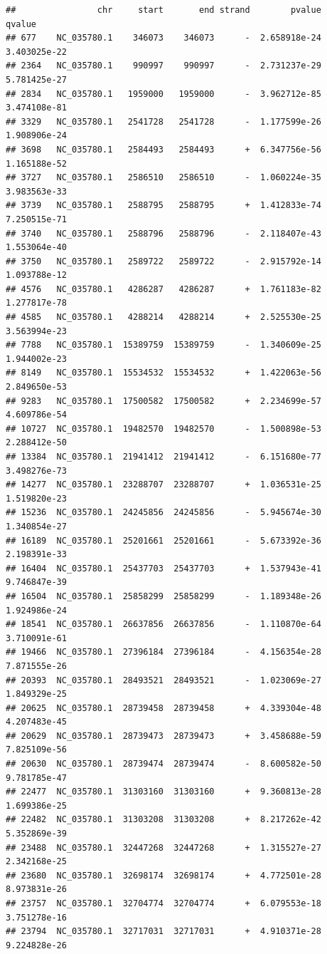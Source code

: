 \documentclass[]{article}
\begin{document}
\begin{verbatim}
##                chr     start       end strand        pvalue        qvalue
## 677    NC_035780.1    346073    346073      -  2.658918e-24  3.403025e-22
## 2364   NC_035780.1    990997    990997      -  2.731237e-29  5.781425e-27
## 2834   NC_035780.1   1959000   1959000      -  3.962712e-85  3.474108e-81
## 3329   NC_035780.1   2541728   2541728      -  1.177599e-26  1.908906e-24
## 3698   NC_035780.1   2584493   2584493      +  6.347756e-56  1.165188e-52
## 3727   NC_035780.1   2586510   2586510      -  1.060224e-35  3.983563e-33
## 3739   NC_035780.1   2588795   2588795      +  1.412833e-74  7.250515e-71
## 3740   NC_035780.1   2588796   2588796      -  2.118407e-43  1.553064e-40
## 3750   NC_035780.1   2589722   2589722      -  2.915792e-14  1.093788e-12
## 4576   NC_035780.1   4286287   4286287      +  1.761183e-82  1.277817e-78
## 4585   NC_035780.1   4288214   4288214      +  2.525530e-25  3.563994e-23
## 7788   NC_035780.1  15389759  15389759      -  1.340609e-25  1.944002e-23
## 8149   NC_035780.1  15534532  15534532      +  1.422063e-56  2.849650e-53
## 9283   NC_035780.1  17500582  17500582      +  2.234699e-57  4.609786e-54
## 10727  NC_035780.1  19482570  19482570      -  1.500898e-53  2.288412e-50
## 13384  NC_035780.1  21941412  21941412      -  6.151680e-77  3.498276e-73
## 14277  NC_035780.1  23288707  23288707      +  1.036531e-25  1.519820e-23
## 15236  NC_035780.1  24245856  24245856      -  5.945674e-30  1.340854e-27
## 16189  NC_035780.1  25201661  25201661      -  5.673392e-36  2.198391e-33
## 16404  NC_035780.1  25437703  25437703      +  1.537943e-41  9.746847e-39
## 16504  NC_035780.1  25858299  25858299      -  1.189348e-26  1.924986e-24
## 18541  NC_035780.1  26637856  26637856      -  1.110870e-64  3.710091e-61
## 19466  NC_035780.1  27396184  27396184      -  4.156354e-28  7.871555e-26
## 20393  NC_035780.1  28493521  28493521      -  1.023069e-27  1.849329e-25
## 20625  NC_035780.1  28739458  28739458      +  4.339304e-48  4.207483e-45
## 20629  NC_035780.1  28739473  28739473      +  3.458688e-59  7.825109e-56
## 20630  NC_035780.1  28739474  28739474      -  8.600582e-50  9.781785e-47
## 22477  NC_035780.1  31303160  31303160      +  9.360813e-28  1.699386e-25
## 22482  NC_035780.1  31303208  31303208      +  8.217262e-42  5.352869e-39
## 23488  NC_035780.1  32447268  32447268      +  1.315527e-27  2.342168e-25
## 23680  NC_035780.1  32698174  32698174      +  4.772501e-28  8.973831e-26
## 23757  NC_035780.1  32704774  32704774      +  6.079553e-18  3.751278e-16
## 23794  NC_035780.1  32717031  32717031      +  4.910371e-28  9.224828e-26

\end{verbatim}
\end{document}
